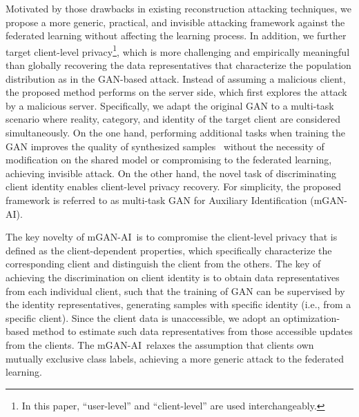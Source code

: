 \documentclass[10pt, conference, letterpaper]{IEEEtran}
\newcommand{\alg}{mGAN-AI}
\begin{document}
Motivated by those drawbacks in existing reconstruction attacking techniques,
we propose a more generic, practical, and invisible attacking framework against the federated learning without affecting the learning process. In addition, we further target client-level privacy\footnote{In this paper, ``user-level'' and ``client-level'' are used interchangeably.},
which is more challenging and empirically meaningful than globally recovering the data representatives that characterize the population distribution as in the GAN-based attack.
Instead of assuming a malicious client, the proposed method performs on the server side, which first explores the attack by a malicious server. Specifically, we adapt the original GAN to a multi-task scenario where reality, category, and identity of the target client are considered simultaneously.
On the one hand, performing additional tasks when training the GAN improves the quality of synthesized samples~\cite{odena2016conditional} without the necessity of modification on the shared model or compromising to the federated learning, achieving invisible attack. On the other hand, the novel task of discriminating client identity enables client-level privacy recovery.
For simplicity, the proposed framework is referred to as multi-task GAN for Auxiliary Identification (\alg). %

The key novelty of
\alg~is to compromise the client-level
privacy
that is defined as the client-dependent properties, which specifically characterize the corresponding client and distinguish the client from the others. The key of achieving the discrimination on client identity is to obtain data representatives from each individual client, such that the training of GAN can be supervised by the identity representatives, generating samples with specific identity (i.e., from a specific client). Since the client data is unaccessible, we adopt an optimization-based method to estimate such data representatives from those accessible updates from the clients. The \alg~relaxes the assumption that clients own mutually exclusive class labels, achieving a more generic attack to the federated learning.
\end{document}

